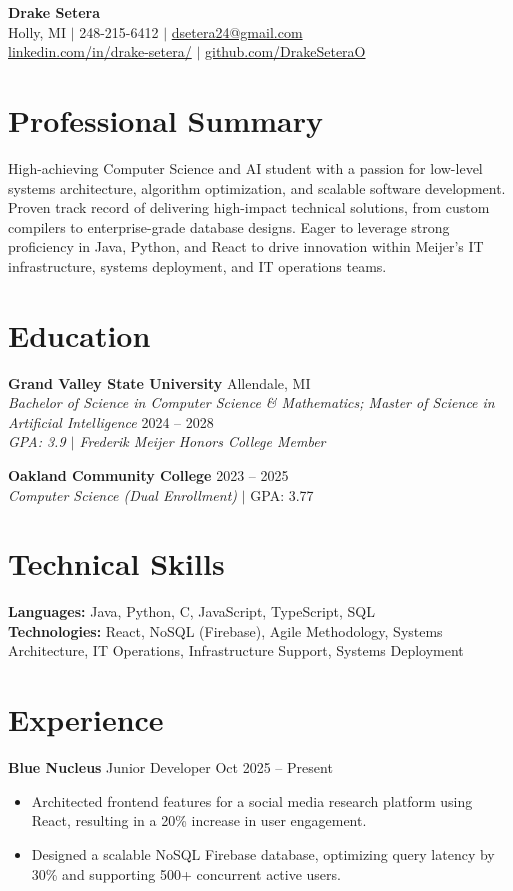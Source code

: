 \documentclass[10pt,letterpaper]{article}
\begin{document}
\begin{center}
    {\LARGE \textbf{Drake Setera}} \\
    Holly, MI $|$ 248-215-6412 $|$ \href{mailto:dsetera24@gmail.com}{dsetera24@gmail.com} \\
    \href{https://www.linkedin.com/in/drake-setera/}{linkedin.com/in/drake-setera/} $|$ \href{https://github.com/DrakeSeteraO}{github.com/DrakeSeteraO}
\end{center}

\section{Professional Summary}
High-achieving Computer Science and AI student with a passion for low-level systems architecture, algorithm optimization, and scalable software development. Proven track record of delivering high-impact technical solutions, from custom compilers to enterprise-grade database designs. Eager to leverage strong proficiency in Java, Python, and React to drive innovation within Meijer's IT infrastructure, systems deployment, and IT operations teams.

\section{Education}
\textbf{Grand Valley State University} \hfill Allendale, MI \\
\textit{Bachelor of Science in Computer Science \& Mathematics; Master of Science in Artificial Intelligence} \hfill 2024 -- 2028 \\
\textit{GPA: 3.9 $|$ Frederik Meijer Honors College Member}

\textbf{Oakland Community College} \hfill 2023 -- 2025 \\
\textit{Computer Science (Dual Enrollment)} $|$ GPA: 3.77

\section{Technical Skills}
\textbf{Languages:} Java, Python, C, JavaScript, TypeScript, SQL \\
\textbf{Technologies:} React, NoSQL (Firebase), Agile Methodology, Systems Architecture, IT Operations, Infrastructure Support, Systems Deployment

\section{Experience}
\textbf{Blue Nucleus} \hfill Junior Developer \hfill Oct 2025 -- Present \\
\begin{itemize}
    \item Architected frontend features for a social media research platform using React, resulting in a 20\% increase in user engagement.
    \item Designed a scalable NoSQL Firebase database, optimizing query latency by 30\% and supporting 500+ concurrent active users.
\end{itemize}
\end{document}
